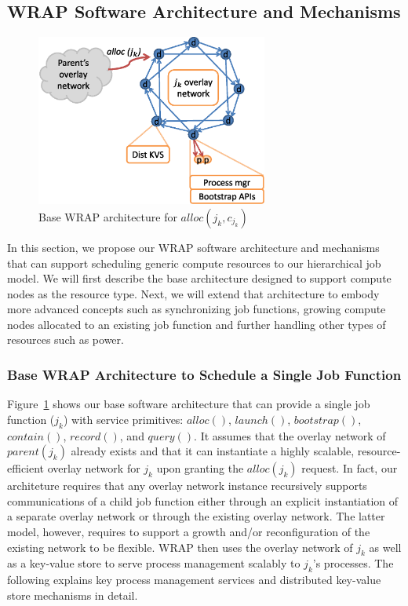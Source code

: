 \subsection{WRAP Software Architecture and Mechanisms}
\label{sect:arch}
\begin{figure}
  \centering
    \includegraphics[width=3.0in]{../fig/WRAP_Base.ps}
  \caption{Base WRAP architecture for $alloc(j_k, c_{j_k})$}
  \label{fig:base}
\end{figure}
In this section, we propose our WRAP software architecture and mechanisms
that can support scheduling generic compute resources to our hierarchical job
model. We will first describe the base architecture designed to support
compute nodes as the resource type. Next, we will extend that architecture
to embody more advanced concepts such as synchronizing job functions,
growing compute nodes allocated to an existing job function and further
handling other types of resources such as power.

\subsubsection{Base WRAP Architecture to Schedule a Single Job Function}
Figure~\ref{fig:base} shows our base software architecture
that can provide a single job function ($j_k$) with service primitives:
$alloc()$,
$launch()$,
$bootstrap()$,
$contain()$,
$record()$, and
$query()$.
It assumes that the overlay network of $parent(j_k)$
already exists and that it can instantiate a highly scalable,
resource-efficient overlay network for $j_k$ upon
granting the $alloc(j_k)$ request. In fact, our architeture
requires that any overlay network instance recursively
supports communications of a child job function either
through an explicit instantiation of a separate overlay network
or through the existing overlay network. The latter model,
however, requires to support a growth and/or reconfiguration
of the existing network to be flexible.
WRAP then uses the overlay network of $j_k$ as well as
a key-value store to serve process management scalably
to $j_k$'s processes.
The following explains key process management services
and distributed key-value store mechanisms in detail.

